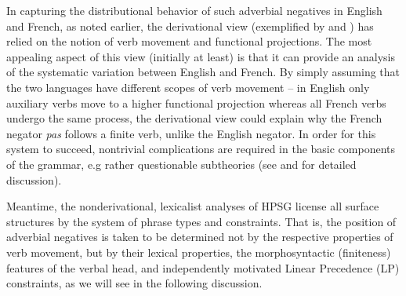 \documentclass[output=paper
                ,modfonts
                		,nonflat
	        ,collection
	        ,collectionchapter
	        ,collectiontoclongg
 	        ,biblatex
                ,babelshorthands
                ,newtxmath
                ,draftmode
                ,colorlinks, citecolor=brown
]{./langsci/langscibook}
\begin{document}
{\begin{exe}
\begin{xlist}
\begin{exe}
\begin{xlist}
In capturing the distributional behavior of such adverbial negatives
in English and French, as noted earlier, the derivational view (exemplified by \citet{Pollock:89} and \citet{Chomsky:91})
has relied on the notion of verb
movement and functional projections.  The most appealing aspect of this
view (initially at least) is that it can provide an analysis of the
systematic variation
between English and French. By simply assuming that the
two languages have different scopes of verb movement -- in English
only auxiliary verbs move to a higher functional projection whereas
all French verbs undergo the same process, the derivational
view could explain why the French negator \textit{pas} follows
a finite verb, unlike the English negator.  In order for this system to succeed,
nontrivial complications are required in the basic components of the
grammar, e.g rather questionable subtheories (see \citet{Kim:00} and \citet{KS:02}
for detailed discussion).

Meantime, the nonderivational, lexicalist analyses of HPSG
license all surface structures by the system of phrase types
and constraints.  That is, the position of
adverbial negatives is taken to be determined not by
the respective properties of verb movement, but by their lexical
properties, the morphosyntactic (finiteness) features of the verbal head,
and independently motivated Linear Precedence (LP) constraints, as
we will see in the following discussion.

\end{xlist}
\end{exe}
\end{xlist}
\end{exe}}
\end{document}
